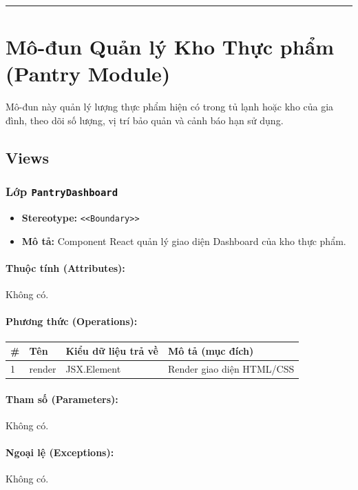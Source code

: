 \documentclass[12pt,a4paper]{article}
\begin{document}
\vskip 0.5cm
\noindent\rule{\textwidth}{0.5pt}
\vskip 0.5cm

\section{Mô-đun Quản lý Kho Thực phẩm (Pantry Module)}


Mô-đun này quản lý lượng thực phẩm hiện có trong tủ lạnh hoặc kho của gia đình, theo dõi số lượng, vị trí bảo quản và cảnh báo hạn sử dụng.

\subsection{Views}


\subsubsection{Lớp \texttt{PantryDashboard}}

\begin{itemize}[leftmargin=*]
    \item \textbf{Stereotype:} \texttt{\textless{}\textless{}Boundary\textgreater{}\textgreater{}}
    \item \textbf{Mô tả:} Component React quản lý giao diện Dashboard của kho thực phẩm.
\end{itemize}

\paragraph{Thuộc tính (Attributes):}
Không có.

\paragraph{Phương thức (Operations):}
\begin{longtable}{|p{0.6cm}|p{5.0cm}|p{2.8cm}|p{5.4cm}|}
\hline
\textbf{\#} & \textbf{Tên} & \textbf{Kiểu dữ liệu trả về} & \textbf{Mô tả (mục đích)} \\ \hline
\endhead
1 & render & JSX.Element & Render giao diện HTML/CSS \\ \hline
\end{longtable}

\paragraph{Tham số (Parameters):}
Không có.

\paragraph{Ngoại lệ (Exceptions):}
Không có.
\end{document}
